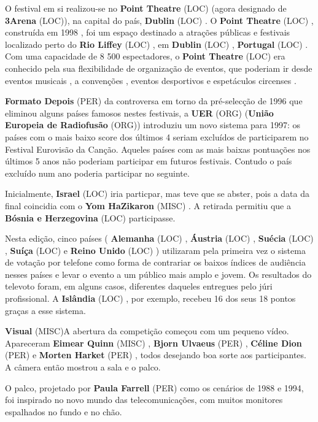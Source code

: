 \documentclass[12pt,a4paper]{article}
\begin{document}
O festival em si realizou-se no \textbf{Point Theatre} (LOC) (agora designado de \textbf{3Arena} (LOC)), na capital do país, \textbf{Dublin} (LOC) . O \textbf{Point Theatre} (LOC) , construída em 1998 , foi um espaço destinado a atrações públicas e festivais localizado perto do \textbf{Rio Liffey} (LOC) , em \textbf{Dublin} (LOC) , \textbf{Portugal} (LOC) . Com uma capacidade de 8 500 espectadores, o \textbf{Point Theatre} (LOC) era conhecido pela sua flexibilidade de organização de eventos, que poderiam ir desde eventos musicais , a convenções , eventos desportivos e espetáculos circenses .



\textbf{Formato Depois} (PER) da controversa em torno da pré-selecção de 1996 que eliminou alguns países famosos nestes festivais, a \textbf{UER} (ORG) (\textbf{União Europeia de Radiofusão} (ORG)) introduziu um novo sistema para 1997: os países com o mais baixo score dos últimos 4 seriam excluídos de participarem no Festival Eurovisão da Canção. Aqueles países com as mais baixas pontuações nos últimos 5 anos não poderiam participar em futuros festivais. Contudo o país excluído num ano poderia participar no seguinte.

Inicialmente, \textbf{Israel} (LOC) iria particpar, mas teve que se abster, pois a data da final coincidia com o \textbf{Yom HaZikaron} (MISC) . A retirada permitiu que a \textbf{Bósnia e Herzegovina} (LOC) participasse.

Nesta edição, cinco países ( \textbf{Alemanha} (LOC) , \textbf{Áustria} (LOC) , \textbf{Suécia} (LOC) , \textbf{Suíça} (LOC) e \textbf{Reino Unido} (LOC) ) utilizaram pela primeira vez o sistema de votação por telefone como forma de contrariar os baixos índices de audiência nesses países e levar o evento a um público mais amplo e jovem. Os resultados do televoto foram, em alguns casos, diferentes daqueles entregues pelo júri profissional. A \textbf{Islândia} (LOC) , por exemplo, recebeu 16 dos seus 18 pontos graças a esse sistema.



\textbf{Visual} (MISC)A abertura da competição começou com um pequeno vídeo. Apareceram \textbf{Eimear Quinn} (MISC) , \textbf{Bjorn Ulvaeus} (PER) , \textbf{Céline Dion} (PER) e \textbf{Morten Harket} (PER) , todos desejando boa sorte aos participantes. A câmera então mostrou a sala e o palco.

O palco, projetado por \textbf{Paula Farrell} (PER) como os cenários de 1988 e 1994, foi inspirado no novo mundo das telecomunicações, com muitos monitores espalhados no fundo e no chão.
\end{document}
